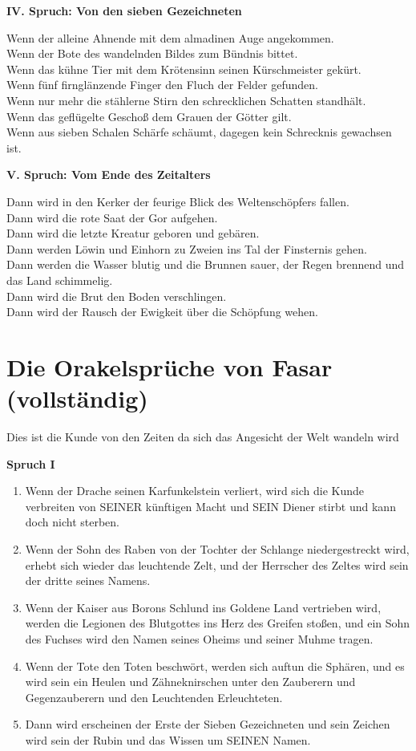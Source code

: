 \textbf{IV. Spruch: Von den sieben Gezeichneten}

Wenn der alleine Ahnende mit dem almadinen Auge angekommen.\\
Wenn der Bote des wandelnden Bildes zum Bündnis bittet.\\
Wenn das kühne Tier mit dem Krötensinn seinen Kürschmeister gekürt.\\
Wenn fünf firnglänzende Finger den Fluch der Felder gefunden.\\
Wenn nur mehr die stählerne Stirn den schrecklichen Schatten standhält.\\
Wenn das geflügelte Geschoß dem Grauen der Götter gilt.\\
Wenn aus sieben Schalen Schärfe schäumt, dagegen kein Schrecknis gewachsen ist.

\textbf{V. Spruch: Vom Ende des Zeitalters}

Dann wird in den Kerker der feurige Blick des Weltenschöpfers fallen.\\
Dann wird die rote Saat der Gor aufgehen.\\
Dann wird die letzte Kreatur geboren und gebären.\\
Dann werden Löwin und Einhorn zu Zweien ins Tal der Finsternis gehen.\\
Dann werden die Wasser blutig und die Brunnen sauer, der Regen brennend und das Land schimmelig.\\
Dann wird die Brut den Boden verschlingen.\\
Dann wird der Rausch der Ewigkeit über die Schöpfung wehen.


\section{Die Orakelsprüche von Fasar (vollständig)}

Dies ist die Kunde von den Zeiten da sich das Angesicht der Welt wandeln wird

\textbf{Spruch I}

\begin{enumerate}
    \item Wenn der Drache seinen Karfunkelstein verliert, wird sich die Kunde verbreiten von SEINER künftigen Macht und SEIN Diener stirbt und kann doch nicht sterben.
    \item Wenn der Sohn des Raben von der Tochter der Schlange niedergestreckt wird, erhebt sich wieder das leuchtende Zelt, und der Herrscher des Zeltes wird sein der dritte seines Namens.
    \item Wenn der Kaiser aus Borons Schlund ins Goldene Land vertrieben wird, werden die Legionen des Blutgottes ins Herz des Greifen stoßen, und ein Sohn des Fuchses wird den Namen seines Oheims und seiner Muhme tragen.
    \item Wenn der Tote den Toten beschwört, werden sich auftun die Sphären, und es wird sein ein Heulen und Zähneknirschen unter den Zauberern und Gegenzauberern und den Leuchtenden Erleuchteten.
    \item Dann wird erscheinen der Erste der Sieben Gezeichneten und sein Zeichen wird sein der Rubin und das Wissen um SEINEN Namen.
\end{enumerate}

